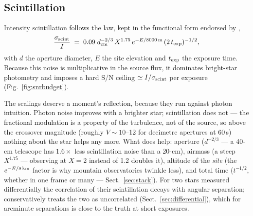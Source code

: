 \subsection{Scintillation}
\label{sec:scintillation}

Intensity scintillation follows the \citet{young1967} law, kept in the
functional form endorsed by \citet{osborn2015},
\begin{equation}
  \frac{\sigma_{\rm scint}}{I} \;=\;
  0.09\; d_{\rm cm}^{-2/3}\, X^{1.75}\,
  e^{-E/\SI{8000}{m}}\,(2\,t_{\rm exp})^{-1/2},
  \label{eq:scint}
\end{equation}
with $d$ the aperture diameter, $E$ the site elevation and $t_{\rm exp}$
the exposure time. Because this noise is multiplicative in the source flux,
it dominates bright-star photometry and imposes a hard S/N ceiling
$\simeq I/\sigma_{\rm scint}$ per exposure (Fig.~\ref{fig:snrbudget}).

The scalings deserve a moment's reflection, because they run against
photon intuition. Photon noise improves with a brighter star;
scintillation does not --- the fractional modulation is a property of the
turbulence, not of the source, so above the crossover magnitude
(roughly $V \sim 10$--12 for decimetre apertures at 60\,s) nothing about
the star helps any more. What does help: aperture ($d^{-2/3}$ --- a
40-cm telescope has $1.6\times$ less scintillation noise than a 20-cm),
airmass (a steep $X^{1.75}$ --- observing at $X=2$ instead of 1.2
doubles it), altitude of the \emph{site} (the $e^{-E/8\,{\rm km}}$
factor is why mountain observatories twinkle less), and total time
($t^{-1/2}$, whether in one frame or many --- Sect.~\ref{sec:stack}).
For two stars measured differentially the correlation of their
scintillation decays with angular separation; \spetc{} conservatively
treats the two as uncorrelated (Sect.~\ref{sec:differential}), which for
arcminute separations is close to the truth at short exposures.
